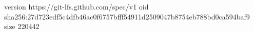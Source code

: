 version https://git-lfs.github.com/spec/v1
oid sha256:27d723edf5c4dfb46ac0f6757bfff54911d2509047b8754eb788bd0ca594baf9
size 220442
